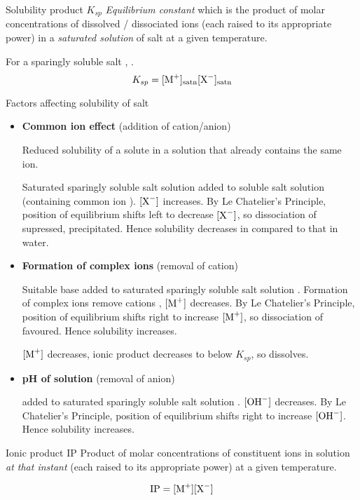 \begin{defn}{Solubility product $K_{sp}$}{}
\emph{Equilibrium constant} which is the product of molar concentrations of dissolved / dissociated ions (each raised to its appropriate power) in a \emph{saturated solution} of salt at a given temperature.
\end{defn}

For a sparingly soluble salt , .
\begin{equation}
K_{sp} = [\ce{M+}]_\text{satn}[\ce{X-}]_\text{satn}
\end{equation}

Factors affecting solubility of salt
\begin{itemize}
\item \textbf{Common ion effect} (addition of cation/anion) 

Reduced solubility of a solute in a solution that already contains the same ion.

Saturated sparingly soluble salt solution  added to soluble salt solution  (containing common ion ). $[\ce{X-}]$ increases. By Le Chatelier's Principle, position of equilibrium shifts left to decrease $[\ce{X-}]$, so dissociation of  supressed,  precipitated. Hence solubility decreases in  compared to that in water.

\item \textbf{Formation of complex ions} (removal of cation)

Suitable base added to saturated sparingly soluble salt solution . Formation of complex ions remove cations , $[\ce{M+}]$ decreases. By Le Chatelier's Principle, position of equilibrium shifts right to increase $[\ce{M+}]$, so dissociation of  favoured. Hence solubility increases.

$[\ce{M+}]$ decreases, ionic product decreases to below $K_{sp}$, so  dissolves.

\item \textbf{pH of solution} (removal of anion)

 added to saturated sparingly soluble salt solution . $[\ce{OH-}]$ decreases. By Le Chatelier's Principle, position of equilibrium shifts right to increase $[\ce{OH-}]$. Hence solubility increases.
\end{itemize}

\begin{defn}{Ionic product $\text{IP}$}{}
Product of molar concentrations of constituent ions in solution \emph{at that instant} (each raised to its appropriate power) at a given temperature.
\end{defn}
\begin{equation}
\text{IP} = [\ce{M+}][\ce{X-}]
\end{equation}


